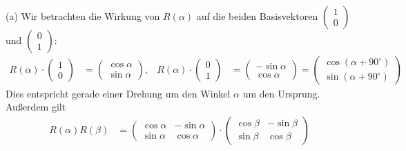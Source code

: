 \documentclass[11pt]{exam}
\begin{document}
\begin{questions}

\begin{solution}\\
	(a) Wir betrachten die Wirkung von $R(\alpha)$ auf die beiden Basisvektoren $\left(\begin{array}{c}1\\0\end{array}\right)$ und $\left(\begin{array}{c}0\\1\end{array}\right)$: \begin{align*}
		R(\alpha)\cdot\left(\begin{array}{c}1\\0\end{array}\right)&=\left(\begin{array}{c}\cos\alpha\\\sin\alpha\end{array}\right),& R(\alpha)\cdot\left(\begin{array}{c}0\\1\end{array}\right)&=\left(\begin{array}{c}-\sin\alpha\\\cos\alpha\end{array}\right)=\left(\begin{array}{c}\cos(\alpha+90^\circ)\\\sin(\alpha+90^\circ)\end{array}\right)
	\end{align*}
	Dies entspricht gerade einer Drehung um den Winkel $\alpha$ um den Ursprung. Außerdem gilt
	\begin{align*}
		R(\alpha)R(\beta)&=\left(\begin{array}{cc}\cos\alpha&-\sin\alpha\\\sin\alpha&\cos\alpha\end{array}\right)\cdot\left(\begin{array}{cc}\cos\beta&-\sin\beta\\\sin\beta&\cos\beta\end{array}\right)\\

\end{align*}
\end{solution}
\end{questions}
\end{document}
